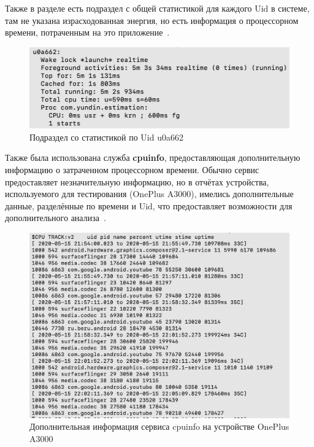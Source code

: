 \documentclass[a4paper,14pt]{extarticle} %
\begin{document}
	Также в разделе есть подраздел с общей статистикой для каждого Uid в системе, там не указана израсходованная энергия, но есть информация о процессорном времени, потраченным на это приложение~\ris{\ref{fig:uid_subsection}}.

	\begin{figure}[!htb]
		\includegraphics[width=\textwidth]{uid_subsection}
		\caption{Подраздел со статистикой по Uid u0a662}
		\label{fig:uid_subsection}
	\end{figure}

	Также была использована служба \textbf{cpuinfo}, предоставляющая дополнительную информацию о затраченном процессорном времени. Обычно сервис предоставляет незначительную информацию, но в отчётах устройства, используемого для тестирования (OnePlus A3000), имелись дополнительные данные, разделённые по времени и Uid, что предоставляет возможности для дополнительного анализа~\ris{\ref{fig:cpuinfo}}.
	
	\begin{figure}[H]
		\includegraphics[width=\textwidth]{cpuinfo}
		\caption{Дополнительная информация сервиса cpuinfo на устройстве OnePlus A3000}
		\label{fig:cpuinfo}
	\end{figure}
\end{document}
